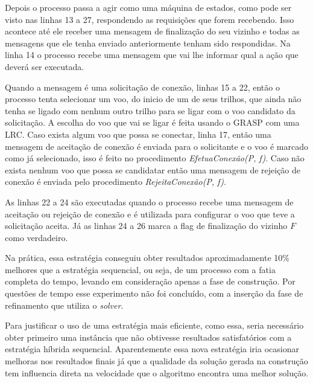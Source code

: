 Depois o processo passa a agir como uma máquina de estados, como pode ser visto
nas linhas 13 a 27, respondendo as requisições que forem recebendo. Isso
acontece até ele receber uma mensagem de finalização do seu vizinho e todas as mensagens
que ele tenha enviado anteriormente tenham sido respondidas. Na linha 14
o processo recebe uma mensagem que vai lhe informar qual a ação que deverá
ser executada.

Quando a mensagem é uma solicitação de conexão, linhas 15 a 22, então o processo
tenta selecionar um voo, do inicio de um de seus trilhos, que ainda não tenha se
ligado com nenhum outro trilho para se ligar com o voo candidato da solicitação.
A escolha do voo que vai se ligar é feita usando o GRASP com uma LRC. Caso
exista algum voo que possa se conectar, linha 17, então uma mensagem de
aceitação de conexão é enviada para o solicitante e o voo é marcado como já
selecionado, isso é feito no procedimento \textit{EfetuaConexão(P, f)}. Caso
não exista nenhum voo que possa se candidatar então uma mensagem de rejeição de
conexão é enviada pelo procedimento \textit{RejeitaConexão(P, f)}.

As linhas 22 a 24 são executadas quando o processo recebe uma mensagem de
aceitação ou rejeição de conexão e é utilizada para configurar o voo que teve a
solicitação aceita. Já as linhas 24 a 26 marca a flag de finalização do vizinho
$F$ como verdadeiro.

Na prática, essa estratégia conseguiu obter resultados aproximadamente 10\%
melhores que a estratégia sequencial, ou seja, de um processo com a fatia
completa do tempo, levando em consideração apenas a fase de construção. Por
questões de tempo esse experimento não foi concluído, com a inserção da fase de
refinamento que utiliza o \textit{solver}.

Para justificar o uso de uma estratégia mais eficiente, como essa, seria
necessário obter primeiro uma instância que não obtivesse resultados
satisfatórios com a estratégia híbrida sequencial. Aparentemente essa nova
estratégia iria ocasionar melhoras nos resultados finais já que a qualidade da
solução gerada na construção tem influencia direta na velocidade que o
algoritmo encontra uma melhor solução.




 
 
